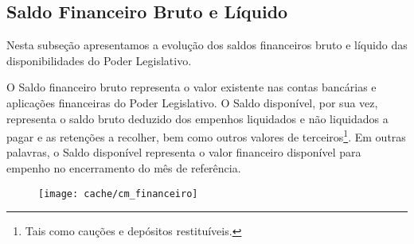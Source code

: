 
\subsection[Saldo Financeiro]{Saldo Financeiro Bruto e Líquido}

Nesta subseção apresentamos a evolução dos saldos financeiros bruto e líquido das disponibilidades do Poder Legislativo.



O Saldo financeiro bruto representa o valor existente nas contas bancárias e aplicações financeiras do Poder Legislativo. O Saldo disponível, por sua vez, representa o saldo bruto deduzido dos empenhos liquidados e não liquidados a pagar e as retenções a recolher, bem como outros valores de terceiros\footnote{Tais como cauções e depósitos restituíveis.}. Em outras palavras, o Saldo disponível representa o valor financeiro disponível para empenho no encerramento do mês de referência.

\begin{figure}
\center
\texttt{[image: cache/cm\_financeiro]}
\end{figure}
